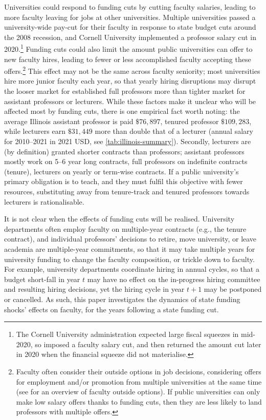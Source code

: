 Universities could respond to funding cuts by cutting faculty salaries, leading to more faculty leaving for jobs at other universities.
Multiple universities passed a university-wide pay-cut for their faculty in response to state budget cuts around the 2008 recession, and Cornell University implemented a professor salary cut in 2020.\footnote{
    The Cornell University administration expected large fiscal squeezes in mid-2020, so imposed a faculty salary cut, and then returned the amount cut later in 2020 when the financial squeeze did not materialise.}
Funding cuts could also limit the amount public universities can offer to new faculty hires, leading to fewer or less accomplished faculty accepting these offers.\footnote{
    Faculty often consider their outside options in job decisions, considering offers for employment and/or promotion from multiple universities at the same time (see \citealt{blackaby2005} for an overview of faculty outside options).
    If public universities can only make low salary offers thanks to funding cuts, then they are less likely to land professors with multiple offers.
}
This effect may not be the same across faculty seniority; most universities hire more junior faculty each year, so that yearly hiring disruptions may disrupt the looser market for established full professors more than tighter market for assistant professors or lecturers.
While these factors make it unclear who will be affected most by funding cuts, there is one empirical fact worth noting: the average Illinois assistant professor is paid $\$76,897$, tenured professor $\$109,283$, while lecturers earn $\$31,449$ more than double that of a lecturer (annual salary for 2010--2021 in 2021 USD, see \autoref{tab:illinois-summary}).
Secondly, lecturers are (by definition) granted shorter contracts than professors; assistant professors mostly work on 5--6 year long contracts, full professors on indefinite contracts (tenure), lecturers on yearly or term-wise contracts.
If a public university's primary obligation is to teach, and they must fulfil this objective with fewer resources, substituting away from tenure-track and tenured professors towards lecturers is rationalisable.

It is not clear when the effects of funding cuts will be realised.
University departments often employ faculty on multiple-year contracts (e.g., the tenure contract), and individual professors' decisions to retire, move university, or leave academia are multiple-year commitments, so that it may take multiple years for university funding to change the faculty composition, or trickle down to faculty.
For example, university departments coordinate hiring in annual cycles, so that a budget short-fall in year $t$ may have no effect on the in-progress hiring committee and resulting hiring decisions, yet the hiring cycle in year $t+1$ may be postponed or cancelled.
As such, this paper investigates the dynamics of state funding shocks' effects on faculty, for the years following a state funding cut.
